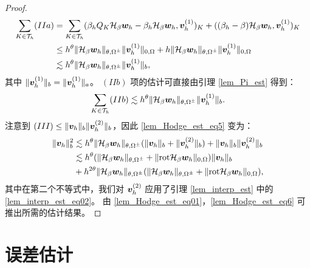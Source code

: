 \begin{proof}
\begin{equation}
\begin{split}
\label{lem_Hodge_est_eq4_1}
\sum_{K\in\mathcal{T}_h}  (IIa) & = \sum_{K\in\mathcal{T}_h}( \beta_h Q_K \mathcal{H}_{\beta}\boldsymbol{w}_h - \beta_h \mathcal{H}_{\beta}\boldsymbol{w}_h,  \boldsymbol{v}^{(1)}_h)_{K} + ( (\beta_h - \beta) \mathcal{H}_{\beta}\boldsymbol{w}_h,  \boldsymbol{v}^{(1)}_h)_{K} \\
& \le h^{\theta} \| \mathcal{H}_{\beta}\boldsymbol{w}_h \|_{\theta,\Omega^{\pm}} \|
\boldsymbol{v}^{(1)}_h \|_{0,\Omega} + h  \| \mathcal{H}_{\beta}\boldsymbol{w}_h
\|_{\theta,\Omega^{\pm}} \| \boldsymbol{v}^{(1)}_h \|_{0,\Omega}  \\
& \lesssim h^{\theta} \| \mathcal{H}_{\beta}\boldsymbol{w}_h \|_{\theta,\Omega^{\pm}} \| \boldsymbol{v}^{(1)}_h \|_b,
\end{split}
\end{equation}
其中 $\| \boldsymbol{v}^{(1)}_h \|_{b} = \| \boldsymbol{v}^{(1)}_h \|_a$。
$(IIb)$ 项的估计可直接由引理 \ref{lem_Pi_est} 得到：
\begin{equation}
\label{lem_Hodge_est_eq4_2}
\sum_{K\in\mathcal{T}_h}  (IIb) \lesssim h^{\theta} \| \mathcal{H}_{\beta}\boldsymbol{w}_h
\|_{\theta,\Omega^{\pm}} \| \boldsymbol{v}^{(1)}_h \|_b.
\end{equation}
注意到 $(III)\le \| \boldsymbol{v}_h  \|_{b}\| \boldsymbol{v}^{(2)}_h \|_{b}$，因此 \eqref{lem_Hodge_est_eq5} 变为：
\begin{equation}
\begin{split}
\label{lem_Hodge_est_eq6}
\| \boldsymbol{v}_h \|^2_{b} &\lesssim h^{\theta} \| \mathcal{H}_{\beta}\boldsymbol{w}_h \|_{\theta,\Omega^{\pm}} ( \| \boldsymbol{v}_h \|_{b} + \| \boldsymbol{v}^{(2)}_h \|_{b}) + \| \boldsymbol{v}_h  \|_{b}\| \boldsymbol{v}^{(2)}_h \|_{b} \\
& \lesssim h^{\theta} ( \| \mathcal{H}_{\beta}\boldsymbol{w}_h \|_{\theta,\Omega^{\pm}} + \| \mathrm{rot} \mathcal{H}_{\beta}\boldsymbol{w}_h \|_{0,\Omega} ) \| \boldsymbol{v}_h \|_{b} \\
&  + h^{2\theta}\| \mathcal{H}_{\beta}\boldsymbol{w}_h \|_{\theta,\Omega^{\pm}} ( \|
\mathcal{H}_{\beta}\boldsymbol{w}_h \|_{\theta,\Omega^{\pm}} + \| \mathrm{rot}
\mathcal{H}_{\beta}\boldsymbol{w}_h \|_{0,\Omega} ),
\end{split}
\end{equation}
其中在第二个不等式中，我们对 $\boldsymbol{v}^{(2)}_h$ 应用了引理 \ref{lem_interp_est} 中的 \eqref{lem_interp_est_eq02}。
由 \eqref{lem_Hodge_est_eq01}，\eqref{lem_Hodge_est_eq6} 可推出所需的估计结果。
\end{proof}

\section{误差估计}
\label{sec:erroreqn}

